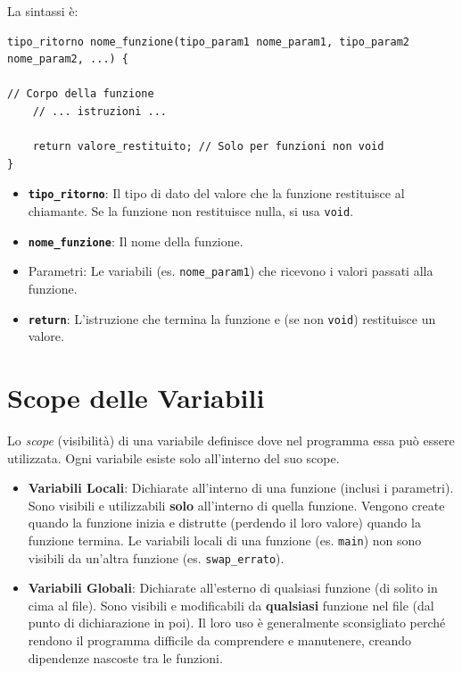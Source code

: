\documentclass[oneside]{scrbook}
\begin{document}
La sintassi è:
\begin{lstlisting}[style=cstyle]
tipo_ritorno nome_funzione(tipo_param1 nome_param1, tipo_param2 nome_param2, ...) {
    
// Corpo della funzione
    // ... istruzioni ...
    
    return valore_restituito; // Solo per funzioni non void
}
\end{lstlisting}
\begin{itemize}
    \item \textbf{\texttt{tipo\_ritorno}}: Il tipo di dato del valore che la funzione restituisce al chiamante. Se la funzione non restituisce nulla, si usa \texttt{void}.
    \item \textbf{\texttt{nome\_funzione}}: Il nome della funzione.
    \item Parametri: Le variabili (es. \texttt{nome\_param1}) che ricevono i valori passati alla funzione.
    \item \textbf{\texttt{return}}: L'istruzione che termina la funzione e (se non \texttt{void}) restituisce un valore.
\end{itemize}

\section{Scope delle Variabili}

Lo \emph{scope} (visibilità) di una variabile definisce dove nel programma essa può essere utilizzata. Ogni variabile esiste solo all'interno del suo scope.

\begin{itemize}
    \item \textbf{Variabili Locali}: Dichiarate all'interno di una funzione (inclusi i parametri). Sono visibili e utilizzabili \textbf{solo} all'interno di quella funzione. Vengono create quando la funzione inizia e distrutte (perdendo il loro valore) quando la funzione termina. Le variabili locali di una funzione (es. \texttt{main}) non sono visibili da un'altra funzione (es. \texttt{swap\_errato}).
    \item \textbf{Variabili Globali}: Dichiarate all'esterno di qualsiasi funzione (di solito in cima al file). Sono visibili e modificabili da \textbf{qualsiasi} funzione nel file (dal punto di dichiarazione in poi). Il loro uso è generalmente sconsigliato perché rendono il programma difficile da comprendere e manutenere, creando dipendenze nascoste tra le funzioni.
\end{itemize}
\end{document}
